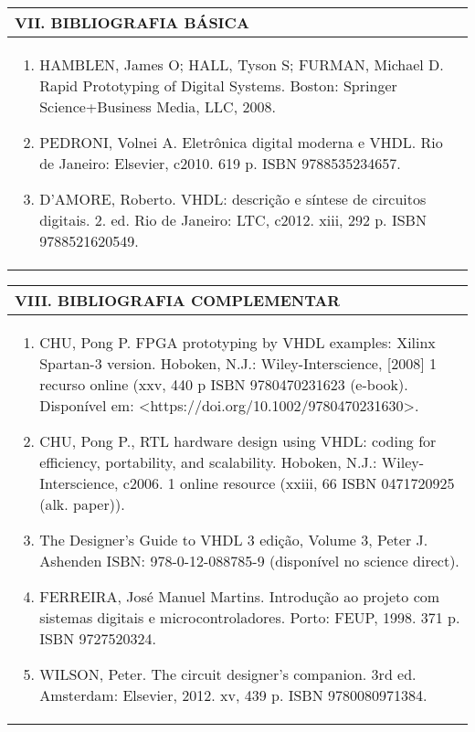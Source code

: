 \documentclass[12pt]{article}
\begin{document}
\begin{longtable}{|L{1.025\textwidth}|} \hline
%
{\bf VII. BIBLIOGRAFIA BÁSICA} \\ \hline

\begin{enumerate}
\item HAMBLEN, James O; HALL, Tyson S; FURMAN, Michael D. Rapid Prototyping of Digital Systems. Boston: Springer Science+Business Media, LLC, 2008. 
\item PEDRONI, Volnei A. Eletrônica digital moderna e VHDL. Rio de Janeiro: Elsevier, c2010. 619 p. ISBN 9788535234657. 
\item D’AMORE, Roberto. VHDL: descrição e síntese de circuitos digitais. 2. ed. Rio de Janeiro: LTC, c2012. xiii, 292 p. ISBN 9788521620549.


\end{enumerate}
 \\ \hline
\end{longtable}



\begin{longtable}{|L{1.025\textwidth}|} \hline
%
{\bf VIII. BIBLIOGRAFIA COMPLEMENTAR} \\ \hline
\begin{enumerate}

\item CHU, Pong P. FPGA prototyping by VHDL examples: Xilinx Spartan-3 version.
Hoboken, N.J.: Wiley-Interscience, [2008] 1 recurso online (xxv, 440 p ISBN 9780470231623 (e-book). Disponível em: <https://doi.org/10.1002/9780470231630>.
\item CHU, Pong P., RTL hardware design using VHDL: coding for efficiency, portability, and scalability. Hoboken, N.J.: Wiley-Interscience, c2006. 1 online resource (xxiii, 66 ISBN 0471720925 (alk. paper)).
\item The Designer’s Guide to VHDL 3 edição, Volume 3, Peter J. Ashenden ISBN: 978-0-12-088785-9 (disponível no science direct).
\item FERREIRA, José Manuel Martins. Introdução ao projeto com sistemas digitais e microcontroladores. Porto: FEUP, 1998. 371 p. ISBN 9727520324.
\item WILSON, Peter. The circuit designer’s companion. 3rd ed. Amsterdam: Elsevier, 2012. xv, 439 p. ISBN 9780080971384.
\end{enumerate}
 \\ \hline
\end{longtable}



\end{document}
